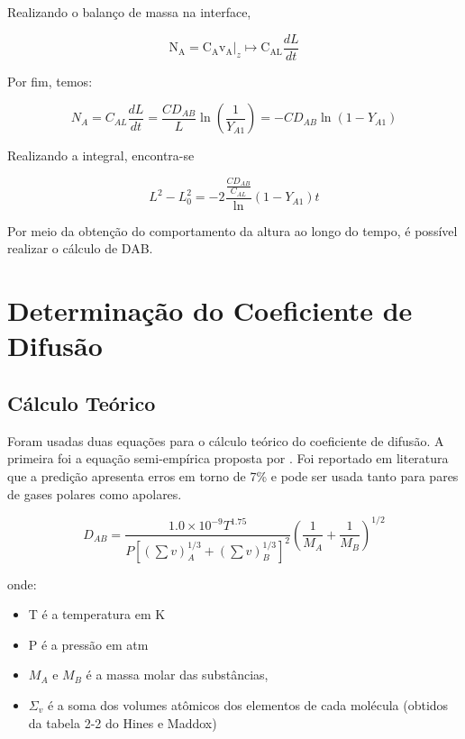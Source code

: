 Realizando o balanço de massa na interface,

\begin{equation}\label{key}
\mathrm{N}_{\mathrm{A}}=\mathrm{C}_{\mathrm{A}}\left.\mathrm{v}_{\mathrm{A}}\right|_{z} \mapsto \mathrm{C}_{\mathrm{AL}} \frac{d L}{d t}
\end{equation}

Por fim, temos:

\begin{equation}\label{key}
N_{A}=C_{A L} \frac{d L}{d t}=\frac{C D_{AB}}{L} \ln \left(\frac{1}{Y _{A 1}}\right)=-C D_{A B} \ln \left(1-Y_{A 1}\right)
\end{equation}

Realizando a integral, encontra-se

\begin{equation}\label{key}
L^{2}-L_{0}^{2}=-2 \frac{\frac{C D _{A B}}{C_{A L}}} \ln \left(1-Y_{A 1}\right) t
\end{equation}

Por meio da obtenção do comportamento da altura ao longo do tempo, é possível realizar o cálculo de DAB. 
\\

\chapter{Determinação do Coeficiente de Difusão}


\section{Cálculo Teórico}

Foram usadas duas equações para o cálculo teórico do coeficiente de difusão.
A primeira foi a equação semi-empírica proposta por \citep{Fuller}. Foi reportado em literatura que a predição apresenta erros em torno de 7\% e pode ser usada tanto para pares de gases polares como apolares.


\begin{equation}\label{key}
D_{A B}=\frac{1.0 \times 10^{-9} T^{1.75}}{P\left[\left(\sum v\right)_{A}^{1 / 3}+\left(\sum v\right)_{B}^{1 / 3}\right]^{2}}\left(\frac{1}{M_{A}}+\frac{1}{M_{B}}\right)^{1 / 2}
\end{equation}


onde:

\begin{itemize}

\item T é a temperatura em K

\item P é a pressão em atm

\item $M_{A}$ e $M_{B}$ é a massa molar das substâncias,

\item $\Sigma_{v}$ é a soma dos volumes atômicos dos elementos de cada molécula (obtidos da tabela 2-2 do Hines e Maddox)

\end{itemize}


